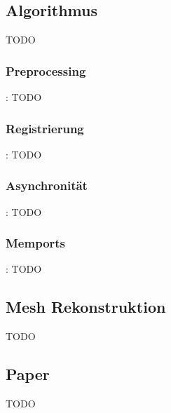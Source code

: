 \documentclass{beamer}
\begin{document}
\subsection{Algorithmus}
\begin{frame}{\subsecname}
TODO
\end{frame}

\subsubsection{Preprocessing}
\begin{frame}{\subsecname: \subsubsecname}
TODO
\end{frame}

\subsubsection{Registrierung}
\begin{frame}{\subsecname: \subsubsecname}
TODO
\end{frame}

\subsubsection{Asynchronität}
\begin{frame}{\subsecname: \subsubsecname}
TODO
\end{frame}

\subsubsection{Memports}
\begin{frame}{\subsecname: \subsubsecname}
TODO
\end{frame}

\subsection{Mesh Rekonstruktion}
\begin{frame}{\subsecname}
TODO
\end{frame}

\subsection{Paper}
\begin{frame}{\subsecname}
TODO
\end{frame}

\end{document}
